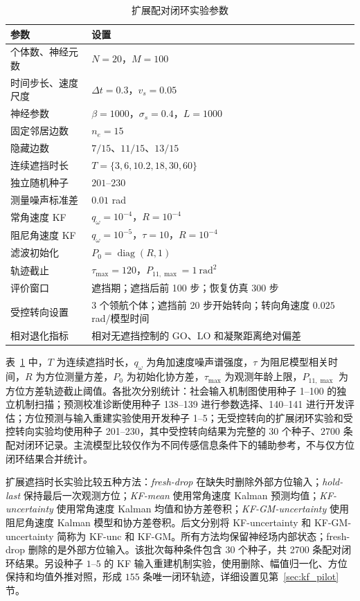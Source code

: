 \documentclass[UTF8,fontset=windows,11pt]{ctexart}
\begin{document}
\begin{table}[htbp]
 \centering
 \small
 \caption{扩展配对闭环实验参数}
 \label{tab:simulation_setup}
 \begin{tabular}{ll}
 \toprule
 参数 & 设置\\
 \midrule
 个体数、神经元数 & $N=20$，$M=100$\\
 时间步长、速度尺度 & $\Delta t=0.3$，$v_s=0.05$\\
 神经参数 & $\beta=1000$，$\sigma_s=0.4$，$L=1000$\\
 固定邻居边数 & $n_e=15$\\
 隐藏边数 & $7/15$、$11/15$、$13/15$\\
 连续遮挡时长 & $T=\{3,6,10.2,18,30,60\}$\\
 独立随机种子 & $201$--$230$\\
 测量噪声标准差 & $0.01$ rad\\
 常角速度 KF & $q_\omega=10^{-4}$，$R=10^{-4}$\\
 阻尼角速度 KF & $q_\omega=10^{-5}$，$\tau=10$，$R=10^{-4}$\\
 滤波初始化 & $P_0=\operatorname{diag}(R,1)$\\
轨迹截止 & $\tau_{\max}=120$，$P_{11,\max}=1\ \mathrm{rad}^2$\\
评价窗口 & 遮挡期；遮挡后前 100 步；恢复仿真 300 步\\
受控转向设置 & 3 个领航个体；遮挡前 20 步开始转向；转向角速度 $0.025$ rad/模型时间\\
相对退化指标 & 相对无遮挡控制的 GO、LO 和凝聚距离绝对偏差\\
 \bottomrule
 \end{tabular}
\end{table}

表~\ref{tab:simulation_setup} 中，$T$ 为连续遮挡时长，$q_\omega$ 为角加速度噪声谱强度，$\tau$ 为阻尼模型相关时间，$R$ 为方位测量方差，$P_0$ 为初始化协方差，$\tau_{\max}$ 为观测年龄上限，$P_{11,\max}$ 为方位方差轨迹截止阈值。各批次分别统计：社会输入机制图使用种子 1--100 的独立机制扫描；预测校准诊断使用种子 138--139 进行参数选择、140--141 进行开发评估；方位预测与输入重建实验使用开发种子 1--5；无受控转向的扩展闭环实验和受控转向实验均使用种子 201--230，其中受控转向结果为完整的 $30$ 个种子、$2700$ 条配对闭环记录。主流模型比较仅作为不同传感信息条件下的辅助参考，不与仅方位闭环结果合并统计。

扩展遮挡时长实验比较五种方法：\textit{fresh-drop} 在缺失时删除外部方位输入；\textit{hold-last} 保持最后一次观测方位；\textit{KF-mean} 使用常角速度 Kalman 预测均值；\textit{KF-uncertainty} 使用常角速度 Kalman 均值和协方差卷积；\textit{KF-GM-uncertainty} 使用阻尼角速度 Kalman 模型和协方差卷积。后文分别将 KF-uncertainty 和 KF-GM-uncertainty 简称为 KF-unc 和 KF-GM。所有方法均保留神经场内部状态；fresh-drop 删除的是外部方位输入。该批次每种条件包含 30 个种子，共 2700 条配对闭环结果。另设种子 $1$--$5$ 的 KF 输入重建机制实验，使用删除、幅值归一化、方位保持和均值外推对照，形成 $155$ 条唯一闭环轨迹，详细设置见第~\ref{sec:kf_pilot} 节。
\end{document}
